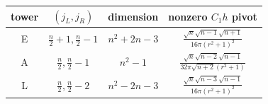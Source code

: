 \begin{tabular}{c|c|c|c}
tower & $(j_L,j_R)$ & dimension & nonzero $C_1h$ pivot \\
\hline
E & ${\frac{n}{2} + 1},{\frac{n}{2} - 1}$ & $n^{2} + 2 n - 3$ & $\frac{\sqrt{n} \sqrt{n - 1} \sqrt{n + 1}}{16 \pi \left(r^{2} + 1\right)^{2}}$ \\
A & ${\frac{n}{2}},{\frac{n}{2} - 1}$ & $n^{2} - 1$ & $\frac{\sqrt{n} \sqrt{n - 2} \sqrt{n - 1}}{32 \pi \sqrt{n + 2} \left(r^{2} + 1\right)}$ \\
L & ${\frac{n}{2}},{\frac{n}{2} - 2}$ & $n^{2} - 2 n - 3$ & $\frac{\sqrt{n} \sqrt{n - 3} \sqrt{n - 1}}{16 \pi \left(r^{2} + 1\right)^{2}}$ \\
\end{tabular}
